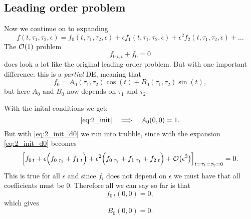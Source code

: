 \documentclass[11pt,letter, swedish, english
]{article}
\begin{document}



\subsection{Leading order problem}
Now we continue on to expanding
\begin{equation}
f(t, \tau_1, \tau_2, \epsilon)=
f_0(t, \tau_1, \tau_2, \epsilon) 
+\epsilon f_1(t, \tau_1, \tau_2, \epsilon) 
+\epsilon^2 f_2(t, \tau_1, \tau_2, \epsilon)+\ldots 
\end{equation}
The $\order{1}$ problem
\begin{equation}
f_{0\;t,t}+f_0=0
\end{equation}
does look a lot like the original leading order problem. But with one
important difference: this is a \emph{partial} DE, meaning that
\begin{equation}\label{eq:2_f0}
f_0=A_0(\tau_1, \tau_2)\cos(t)+B_0(\tau_1, \tau_2)\sin(t),
\end{equation}
but here $A_0$ and $B_0$ now depends on $\tau_1$ and $\tau_2$.

With the inital conditions we get:
\begin{equation}\label{eq:2b_init_A}
\eqref{eq:2_init}\quad\Longrightarrow\quad
A_0(0, 0)=1.
\end{equation}
But with \eqref{eq:2_init_d0} we run into trubble, since
with the expansion \eqref{eq:2_init_d0} becomes
\begin{equation}\label{eq:2_init_d}
\qty[f_{0\,t}+\epsilon\Big(f_{0\;\tau_1}+f_{1\;t} \Big)
+\epsilon^2\Big(f_{0\;\tau_2}+f_{1\;\tau_1}+f_{2\;t} \Big)
+\order{\epsilon^3}]_{t=\tau_1=\tau_2=0}=0.
\end{equation}
This is true for all $\epsilon$ and since $f_i$ does not depend on
$\epsilon$ we must have that all coefficients must be 0. Therefore all
we can say so far is that
\begin{equation}
f_{0\;t}(0, 0)=0, 
\end{equation}
which gives
\begin{equation}\label{eq:2b_init_B}
B_0(0, 0)=0.
\end{equation}
\end{document}
